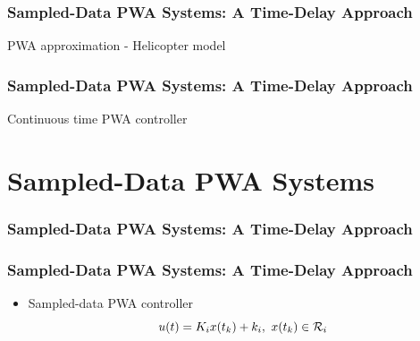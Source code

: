 \documentclass{beamer}
\newcommand{\RR}{{\cal R}}
\newcommand{\beq}{\begin{equation*}}
\newcommand{\eeq}{\end{equation*}}
\begin{document}
\frame
  {  
    \frametitle{Sampled-Data PWA Systems: A Time-Delay Approach}
\centerline{\resizebox{8cm}{!}{}}
\centerline{PWA approximation - Helicopter model}  
}

\frame
  {  
  \frametitle{Sampled-Data PWA Systems: A Time-Delay Approach}
\centerline{\resizebox{8cm}{!}{}}
\centerline{Continuous time PWA controller}    
}

\section[Chapter 6]{Sampled-Data PWA Systems}

  \frame
  {
    \frametitle{Sampled-Data PWA Systems: A Time-Delay Approach}

    \centerline{}
  }

  \frame
  {
    \frametitle{Sampled-Data PWA Systems: A Time-Delay Approach}
\begin{itemize}
\item Sampled-data PWA controller
\beq
u(t)=K_ix(t_k)+k_i,\ x(t_k)\in\RR_i
\eeq
\centerline{}
\end{itemize}
  }
\end{document}
